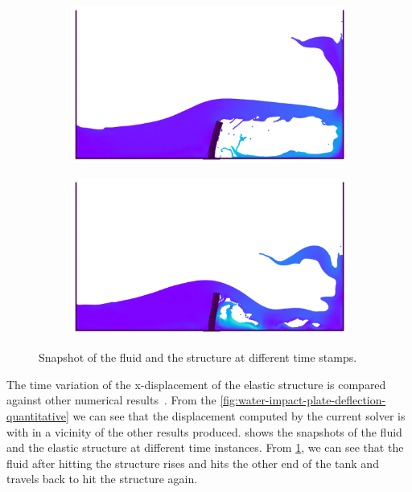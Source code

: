 \begin{figure}[H]
  \begin{subfigure}{0.48\textwidth}
    \centering
        \includegraphics[scale=0.5]{figures/fsi/figures/sun_2019_dam_breaking_flow_impacting_an_elastic_plate/snap_t_3.png}
  \end{subfigure}

  \begin{subfigure}{0.48\textwidth}
    \centering
    \includegraphics[scale=0.5]{figures/fsi/figures/sun_2019_dam_breaking_flow_impacting_an_elastic_plate/snap_t_4.png}
  \end{subfigure}
    \caption
    {
        Snapshot of the fluid and the structure at different time stamps.
    }
    \label{fig:dam-breaking-onto-plate-snapshot}
\end{figure}
The time variation of the x-displacement of the elastic structure is compared
against other numerical results~\citep{sun2019fully,bogaers2016evaluation}. From
the \cref{fig:water-impact-plate-deflection-quantitative} we can see that the
displacement computed by the current solver is with in a vicinity of the other
results produced.  shows the
snapshots of the fluid and the elastic structure at different time instances.
From \cref{fig:dam-breaking-onto-plate-snapshot}, we can see that the fluid
after hitting the structure rises and hits the other end of the tank and travels
back to hit the structure again.


